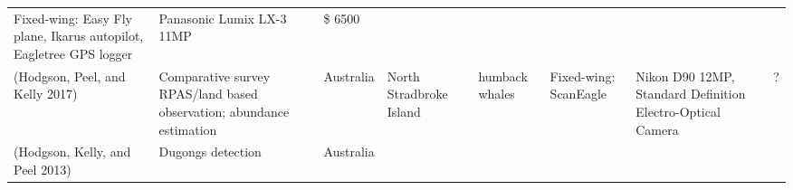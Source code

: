 \documentclass[]{interact}
\theoremstyle{plain}%
\theoremstyle{definition}
\theoremstyle{remark}
\begin{document}
\begin{longtable}[]{@{}llllllll@{}}
\begin{minipage}[t]{0.09\columnwidth}
Fixed-wing: Easy Fly plane, Ikarus autopilot, Eagletree GPS logger\strut
\end{minipage} & \begin{minipage}[t]{0.11\columnwidth}\raggedright\strut
Panasonic Lumix LX-3 11MP\strut
\end{minipage} & \begin{minipage}[t]{0.01\columnwidth}\raggedright\strut
\$ 6500\strut
\end{minipage}\tabularnewline
\begin{minipage}[t]{0.11\columnwidth}\raggedright\strut
(Hodgson, Peel, and Kelly 2017)\strut
\end{minipage} & \begin{minipage}[t]{0.18\columnwidth}\raggedright\strut
Comparative survey RPAS/land based observation; abundance
estimation\strut
\end{minipage} & \begin{minipage}[t]{0.03\columnwidth}\raggedright\strut
Australia\strut
\end{minipage} & \begin{minipage}[t]{0.14\columnwidth}\raggedright\strut
North Stradbroke Island\strut
\end{minipage} & \begin{minipage}[t]{0.10\columnwidth}\raggedright\strut
humback whales\strut
\end{minipage} & \begin{minipage}[t]{0.09\columnwidth}\raggedright\strut
Fixed-wing: ScanEagle\strut
\end{minipage} & \begin{minipage}[t]{0.11\columnwidth}\raggedright\strut
Nikon D90 12MP, Standard Definition Electro-Optical Camera\strut
\end{minipage} & \begin{minipage}[t]{0.01\columnwidth}\raggedright\strut
?\strut
\end{minipage}\tabularnewline
\begin{minipage}[t]{0.11\columnwidth}\raggedright\strut
(Hodgson, Kelly, and Peel 2013)\strut
\end{minipage} & \begin{minipage}[t]{0.18\columnwidth}\raggedright\strut
Dugongs detection\strut
\end{minipage} & \begin{minipage}[t]{0.03\columnwidth}\raggedright\strut
Australia\strut
\end{minipage} & \begin{minipage}[t]{0.14\columnwidth}\raggedright\strut

\end{minipage}
\end{longtable}
\end{document}
